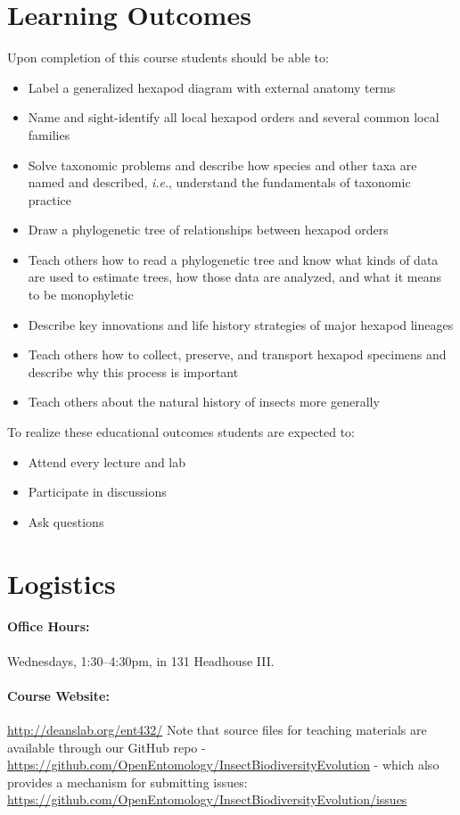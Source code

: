 \documentclass[11pt]{article}
\begin{document}
\section*{Learning Outcomes} 
Upon completion of this course students should be able to:
\begin{itemize}
\item Label a generalized hexapod diagram with external anatomy terms
\item Name and sight-identify all local hexapod orders and several common local families
\item Solve taxonomic problems and describe how species and other taxa are named and described, \textit{i.e}., understand the fundamentals of taxonomic practice
\item Draw a phylogenetic tree of relationships between hexapod orders
\item Teach others how to read a phylogenetic tree and know what kinds of data are used to estimate trees, how those data are analyzed, and what it means to be monophyletic
\item Describe key innovations and life history strategies of major hexapod lineages
\item Teach others how to collect, preserve, and transport hexapod specimens and describe why this process is important
\item Teach others about the natural history of insects more generally
\end{itemize} 

\noindent To realize these educational outcomes students are expected to:
\begin{itemize}
\item Attend every lecture and lab
\item Participate in discussions
\item Ask questions
\end{itemize}

\section*{Logistics} 
\paragraph{Office Hours:} Wednesdays, 1:30--4:30pm, in 131 Headhouse III.

\paragraph{Course Website:} \url{http://deanslab.org/ent432/} Note that source files for teaching materials are available through our GitHub repo - \url{https://github.com/OpenEntomology/InsectBiodiversityEvolution} - which also provides a mechanism for submitting issues:\\ \url{https://github.com/OpenEntomology/InsectBiodiversityEvolution/issues} 
\end{document}
